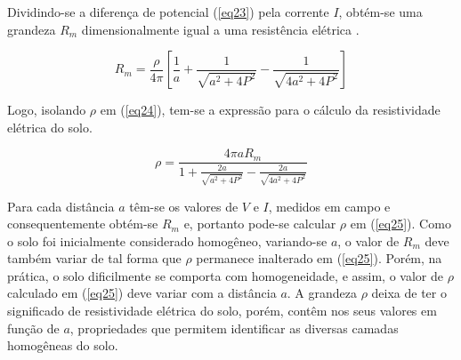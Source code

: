 Dividindo-se a diferença de potencial (\ref{eq23}) pela corrente $I$, obtém-se uma grandeza $R_m$ dimensionalmente igual a uma resistência elétrica \cite{bb14}.

\begin{equation}
  R_m = \frac{\rho}{4\pi}\left[\frac{1}{a} + \frac{1}{\sqrt{a^2 + 4P^2}} - \frac{1}{\sqrt{4a^2 + 4P^2}}\right]
  \label{eq24}
\end{equation}

Logo, isolando $\rho$ em (\ref{eq24}), tem-se a expressão para o cálculo da resistividade elétrica do solo.

\begin{equation}
  \rho = \frac{4 \pi a R_m}{1 + \frac{2a}{\sqrt{a^2 + 4P^2}} - \frac{2a}{\sqrt{4a^2 + 4P^2}}}
  \label{eq25}
\end{equation}

Para cada distância $a$ têm-se os valores de $V$ e $I$, medidos em campo e consequentemente obtém-se $R_m$ e, portanto pode-se calcular $\rho$ em (\ref{eq25}). Como o solo foi inicialmente considerado homogêneo, variando-se $a$, o valor de $R_m$ deve também variar de tal forma que $\rho$ permanece inalterado em (\ref{eq25}). Porém, na prática, o solo dificilmente se comporta com  homogeneidade, e assim, o valor de $\rho$ calculado em (\ref{eq25}) deve variar com a distância $a$. A grandeza $\rho$ deixa de ter o significado de resistividade elétrica do solo, porém, contêm nos seus valores em função de $a$, propriedades que permitem identificar as diversas camadas homogêneas do solo.



